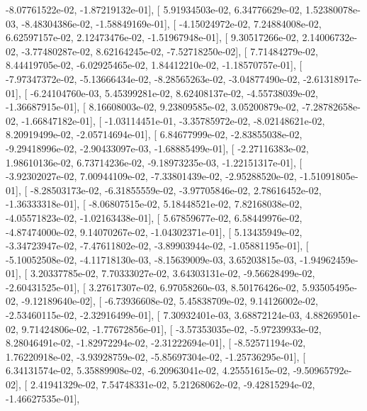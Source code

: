 \documentclass{article}
\begin{document}
         -8.07761522e-02,  -1.87219132e-01],
       [  5.91934503e-02,   6.34776629e-02,   1.52380078e-03,
         -8.48304386e-02,  -1.58849169e-01],
       [ -4.15024972e-02,   7.24884008e-02,   6.62597157e-02,
          2.12473476e-02,  -1.51967948e-01],
       [  9.30517266e-02,   2.14006732e-02,  -3.77480287e-02,
          8.62164245e-02,  -7.52718250e-02],
       [  7.71484279e-02,   8.44419705e-02,  -6.02925465e-02,
          1.84412210e-02,  -1.18570757e-01],
       [ -7.97347372e-02,  -5.13666434e-02,  -8.28565263e-02,
         -3.04877490e-02,  -2.61318917e-01],
       [ -6.24104760e-03,   5.45399281e-02,   8.62408137e-02,
         -4.55738039e-02,  -1.36687915e-01],
       [  8.16608003e-02,   9.23809585e-02,   3.05200879e-02,
         -7.28782658e-02,  -1.66847182e-01],
       [ -1.03114451e-01,  -3.35785972e-02,  -8.02148621e-02,
          8.20919499e-02,  -2.05714694e-01],
       [  6.84677999e-02,  -2.83855038e-02,  -9.29418996e-02,
         -2.90433097e-03,  -1.68885499e-01],
       [ -2.27116383e-02,   1.98610136e-02,   6.73714236e-02,
         -9.18973235e-03,  -1.22151317e-01],
       [ -3.92302027e-02,   7.00944109e-02,  -7.33801439e-02,
         -2.95288520e-02,  -1.51091805e-01],
       [ -8.28503173e-02,  -6.31855559e-02,  -3.97705846e-02,
          2.78616452e-02,  -1.36333318e-01],
       [ -8.06807515e-02,   5.18448521e-02,   7.82168038e-02,
         -4.05571823e-02,  -1.02163438e-01],
       [  5.67859677e-02,   6.58449976e-02,  -4.87474000e-02,
          9.14070267e-02,  -1.04302371e-01],
       [  5.13435949e-02,  -3.34723947e-02,  -7.47611802e-02,
         -3.89903944e-02,  -1.05881195e-01],
       [ -5.10052508e-02,  -4.11718130e-03,  -8.15639009e-03,
          3.65203815e-03,  -1.94962459e-01],
       [  3.20337785e-02,   7.70333027e-02,   3.64303131e-02,
         -9.56628499e-02,  -2.60431525e-01],
       [  3.27617307e-02,   6.97058260e-03,   8.50176426e-02,
          5.93505495e-02,  -9.12189640e-02],
       [ -6.73936608e-02,   5.45838709e-02,   9.14126002e-02,
         -2.53460115e-02,  -2.32916499e-01],
       [  7.30932401e-03,   3.68872124e-03,   4.88269501e-02,
          9.71424806e-02,  -1.77672856e-01],
       [ -3.57353035e-02,  -5.97239933e-02,   8.28046491e-02,
         -1.82972294e-02,  -2.31222694e-01],
       [ -8.52571194e-02,   1.76220918e-02,  -3.93928759e-02,
         -5.85697304e-02,  -1.25736295e-01],
       [  6.34131574e-02,   5.35889908e-02,  -6.20963041e-02,
          4.25551615e-02,  -9.50965792e-02],
       [  2.41941329e-02,   7.54748331e-02,   5.21268062e-02,
         -9.42815294e-02,  -1.46627535e-01],
\end{document}
